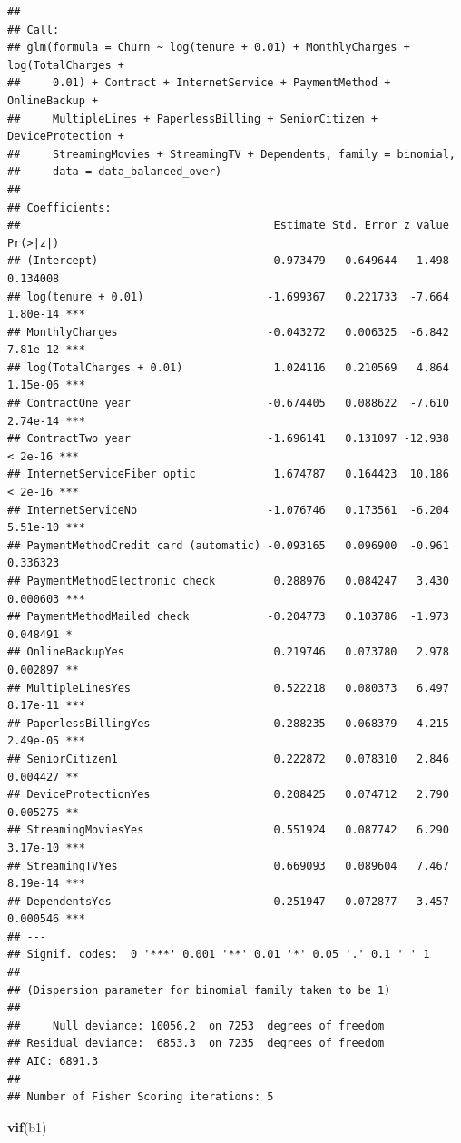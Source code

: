 \documentclass[
  twoside]{article}
\newenvironment{Shaded}{\begin{snugshade}}{\end{snugshade}}
\newcommand{\FunctionTok}[1]{\textcolor[rgb]{0.13,0.29,0.53}{\textbf{#1}}}
\newcommand{\NormalTok}[1]{#1}
\begin{document}
\begin{verbatim}
## 
## Call:
## glm(formula = Churn ~ log(tenure + 0.01) + MonthlyCharges + log(TotalCharges + 
##     0.01) + Contract + InternetService + PaymentMethod + OnlineBackup + 
##     MultipleLines + PaperlessBilling + SeniorCitizen + DeviceProtection + 
##     StreamingMovies + StreamingTV + Dependents, family = binomial, 
##     data = data_balanced_over)
## 
## Coefficients:
##                                       Estimate Std. Error z value Pr(>|z|)    
## (Intercept)                          -0.973479   0.649644  -1.498 0.134008    
## log(tenure + 0.01)                   -1.699367   0.221733  -7.664 1.80e-14 ***
## MonthlyCharges                       -0.043272   0.006325  -6.842 7.81e-12 ***
## log(TotalCharges + 0.01)              1.024116   0.210569   4.864 1.15e-06 ***
## ContractOne year                     -0.674405   0.088622  -7.610 2.74e-14 ***
## ContractTwo year                     -1.696141   0.131097 -12.938  < 2e-16 ***
## InternetServiceFiber optic            1.674787   0.164423  10.186  < 2e-16 ***
## InternetServiceNo                    -1.076746   0.173561  -6.204 5.51e-10 ***
## PaymentMethodCredit card (automatic) -0.093165   0.096900  -0.961 0.336323    
## PaymentMethodElectronic check         0.288976   0.084247   3.430 0.000603 ***
## PaymentMethodMailed check            -0.204773   0.103786  -1.973 0.048491 *  
## OnlineBackupYes                       0.219746   0.073780   2.978 0.002897 ** 
## MultipleLinesYes                      0.522218   0.080373   6.497 8.17e-11 ***
## PaperlessBillingYes                   0.288235   0.068379   4.215 2.49e-05 ***
## SeniorCitizen1                        0.222872   0.078310   2.846 0.004427 ** 
## DeviceProtectionYes                   0.208425   0.074712   2.790 0.005275 ** 
## StreamingMoviesYes                    0.551924   0.087742   6.290 3.17e-10 ***
## StreamingTVYes                        0.669093   0.089604   7.467 8.19e-14 ***
## DependentsYes                        -0.251947   0.072877  -3.457 0.000546 ***
## ---
## Signif. codes:  0 '***' 0.001 '**' 0.01 '*' 0.05 '.' 0.1 ' ' 1
## 
## (Dispersion parameter for binomial family taken to be 1)
## 
##     Null deviance: 10056.2  on 7253  degrees of freedom
## Residual deviance:  6853.3  on 7235  degrees of freedom
## AIC: 6891.3
## 
## Number of Fisher Scoring iterations: 5
\end{verbatim}

\begin{Shaded}
\begin{Highlighting}[]
\FunctionTok{vif}\NormalTok{(b1)}
\end{Highlighting}
\end{Shaded}
\end{document}
